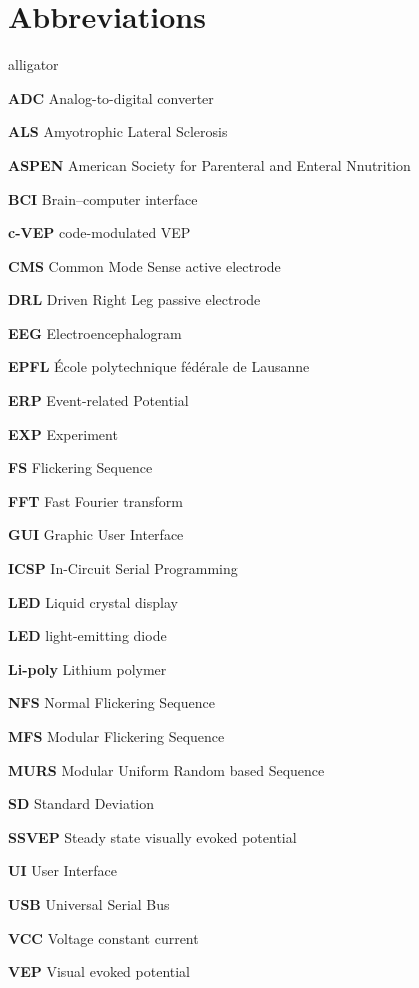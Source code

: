 \chapter*{Abbreviations}
\begin{labeling}{alligator}
	\item[\textbf{ADC}]	Analog-to-digital converter
	\item[\textbf{ALS}]	Amyotrophic Lateral Sclerosis
	\item[\textbf{ASPEN}] American Society for Parenteral and Enteral Nnutrition
	\item[\textbf{BCI}] Brain–computer interface
	\item[\textbf{c-VEP}] code-modulated VEP
	\item[\textbf{CMS}] Common Mode Sense active electrode
	\item[\textbf{DRL}]  Driven Right Leg passive electrode
	\item[\textbf{EEG}] Electroencephalogram
	\item[\textbf{EPFL}] École polytechnique fédérale de Lausanne
	\item[\textbf{ERP}] Event-related Potential
	\item[\textbf{EXP}] Experiment
	\item[\textbf{FS}] Flickering Sequence
	\item[\textbf{FFT}] Fast Fourier transform
	\item[\textbf{GUI}] Graphic User Interface
	\item[\textbf{ICSP}]In-Circuit Serial Programming
	\item[\textbf{LED}] Liquid crystal display
	\item[\textbf{LED}] light-emitting diode
	\item[\textbf{Li-poly}] Lithium polymer
	\item[\textbf{NFS}] Normal Flickering Sequence 
	\item[\textbf{MFS}] Modular Flickering Sequence 
	\item[\textbf{MURS}] Modular Uniform Random based Sequence 
	\item[\textbf{SD}] Standard Deviation
	\item[\textbf{SSVEP}] Steady state visually evoked potential
	\item[\textbf{UI}] User Interface
	\item[\textbf{USB}] Universal Serial Bus
	\item[\textbf{VCC}] Voltage constant current 
	\item[\textbf{VEP}] Visual evoked potential
	
\end{labeling}